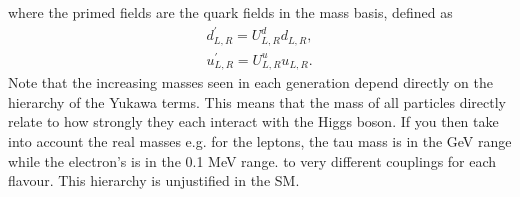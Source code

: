 %
 where the primed fields are the quark fields in the mass basis, defined as 
\begin{equation}
\begin{split}
d^\prime_{L,R} = U^d_{L,R} d_{L,R}, \\
u^\prime_{L,R} = U^u_{L,R} u_{L,R}.
\end{split}  
\end{equation}
% 
Note that the increasing masses seen in each generation depend directly on the  hierarchy of the Yukawa terms. This means that the mass of all particles directly relate to how strongly they each interact with the Higgs boson.
%
If you then take into account the real masses e.g. for the leptons, the tau mass is in the GeV range while the electron's is in the 0.1 MeV range.  to very different couplings for each flavour. 
%
This hierarchy is unjustified in the SM. 

